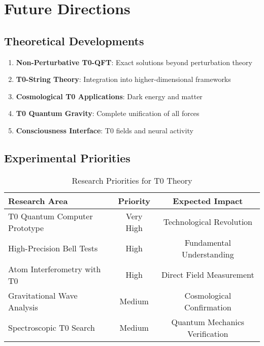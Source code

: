 \documentclass[12pt,a4paper]{article}
\begin{document}
	\section{Future Directions}
	
	\subsection{Theoretical Developments}
	
	\begin{tcolorbox}[colback=blue!5!white,colframe=blue!75!black,title={Open Research Fields}]
		\begin{enumerate}
			\item \textbf{Non-Perturbative T0-QFT}: Exact solutions beyond perturbation theory
			\item \textbf{T0-String Theory}: Integration into higher-dimensional frameworks  
			\item \textbf{Cosmological T0 Applications}: Dark energy and matter
			\item \textbf{T0 Quantum Gravity}: Complete unification of all forces
			\item \textbf{Consciousness Interface}: T0 fields and neural activity
		\end{enumerate}
	\end{tcolorbox}
	
	\subsection{Experimental Priorities}
	
	\begin{table}[htbp]
		\centering
		\begin{tabular}{lcc}
			\toprule
			\textbf{Research Area} & \textbf{Priority} & \textbf{Expected Impact} \\
			\midrule
			T0 Quantum Computer Prototype & Very High & Technological Revolution \\
			High-Precision Bell Tests & High & Fundamental Understanding \\
			Atom Interferometry with T0 & High & Direct Field Measurement \\
			Gravitational Wave Analysis & Medium & Cosmological Confirmation \\
			Spectroscopic T0 Search & Medium & Quantum Mechanics Verification \\
			\bottomrule
		\end{tabular}
		\caption{Research Priorities for T0 Theory}
		\label{tab:research_priorities}
	\end{table}
	
\end{document}
